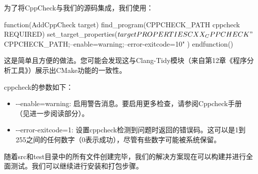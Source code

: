 
为了将CppCheck与我们的源码集成，我们使用：


\begin{cmake}
function(AddCppCheck target)
    find_program(CPPCHECK_PATH cppcheck REQUIRED)
    set_target_properties(${target}
    PROPERTIES CXX_CPPCHECK
        "${CPPCHECK_PATH};--enable=warning;--error-exitcode=10"
    )
endfunction()
\end{cmake}

这是简单且方便的做法。您可能会发现这与Clang-Tidy模块（来自第12章《程序分析工具》）展示出CMake功能的一致性。

cppcheck的参数如下：

\begin{itemize}
\item
-{}-enable=warning: 启用警告消息。要启用更多检查，请参阅Cppcheck手册（见进一步阅读部分）。

\item
-{}-error-exitcode=1: 设置cppcheck检测到问题时返回的错误码。这可以是1到255之间的任何数字（0表示成功），尽管有些数字可能被系统保留。
\end{itemize}

随着src和test目录中的所有文件创建完毕，我们的解决方案现在可以构建并进行全面测试。我们可以继续进行安装和打包步骤。

































